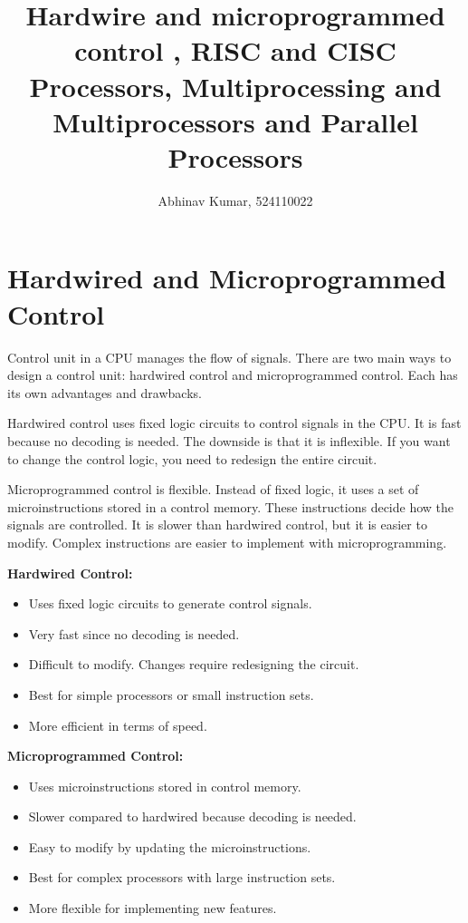 \documentclass[12pt]{article}
\title{Hardwire and microprogrammed control , RISC and CISC Processors, Multiprocessing and Multiprocessors and Parallel Processors}
\author{Abhinav Kumar, 524110022}
\begin{document}
\maketitle
\newpage
\section*{Hardwired and Microprogrammed Control}
Control unit in a CPU manages the flow of signals. There are two main ways to design a control unit: hardwired control and microprogrammed control. Each has its own advantages and drawbacks. 

Hardwired control uses fixed logic circuits to control signals in the CPU. It is fast because no decoding is needed. The downside is that it is inflexible. If you want to change the control logic, you need to redesign the entire circuit.

Microprogrammed control is flexible. Instead of fixed logic, it uses a set of microinstructions stored in a control memory. These instructions decide how the signals are controlled. It is slower than hardwired control, but it is easier to modify. Complex instructions are easier to implement with microprogramming.


\begin{multicols}{2}
    \textbf{Hardwired Control:}
    \begin{itemize}
        \item Uses fixed logic circuits to generate control signals.
        \item Very fast since no decoding is needed.
        \item Difficult to modify. Changes require redesigning the circuit.
        \item Best for simple processors or small instruction sets.
        \item More efficient in terms of speed.
    \end{itemize}
    
    \columnbreak
    
    \textbf{Microprogrammed Control:}
    \begin{itemize}
        \item Uses microinstructions stored in control memory.
        \item Slower compared to hardwired because decoding is needed.
        \item Easy to modify by updating the microinstructions.
        \item Best for complex processors with large instruction sets.
        \item More flexible for implementing new features.
    \end{itemize}
\end{multicols}
\newpage
\end{document}

